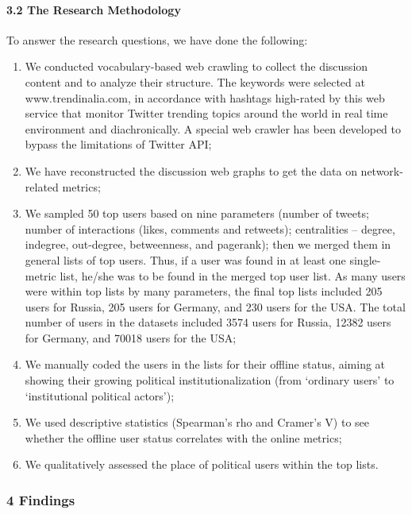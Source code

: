 \paragraph{3.2 The Research Methodology} To answer the research questions, we have done the following:
\begin{enumerate}
	\item We conducted vocabulary-based web crawling to collect the discussion content and to analyze their structure. The keywords were selected at www.trendinalia.com, in accordance with hashtags high-rated by this web service that monitor Twitter trending topics around the world in real time environment and diachronically. A special web crawler has been developed to bypass the limitations of Twitter API;
	
	\item We have reconstructed the discussion web graphs to get the data on network-related metrics;
	
	\item We sampled 50 top users based on nine parameters (number of tweets; number of interactions (likes, comments and retweets); centralities -- degree, indegree, out-degree, betweenness, and pagerank); then we merged them in general lists of top users. Thus, if a user was found in at least one single-metric list, he/she was to be found in the merged top user list. As many users were within top lists by many parameters, the final top lists included 205 users for Russia, 205 users for Germany, and 230 users for the USA. The total number of users in the datasets included 3574 users for Russia, 12382 users for Germany, and 70018 users for the USA;
	
	\item We manually coded the users in the lists for their offline status, aiming at showing their growing political institutionalization (from ‘ordinary users’ to ‘institutional political actors’);
	
	\item We used descriptive statistics (Spearman’s rho and Cramer’s V) to see whether the offline user status correlates with the online metrics;
	
	\item We qualitatively assessed the place of political users within the top lists.
\end{enumerate}

\subsubsection{4 Findings}


